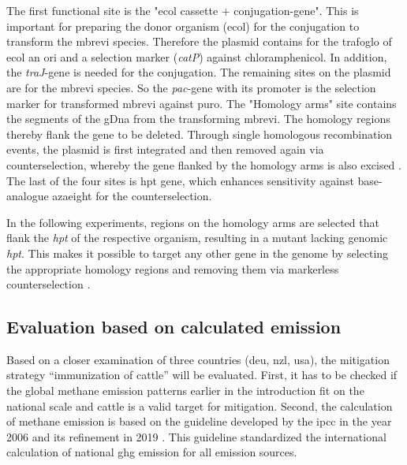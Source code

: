 The first functional site is the "\acrshort{ecol} cassette + conjugation-gene". This is important for preparing the donor organism (\acrshort{ecol}) for the conjugation to transform the \acrlong{mbrevi} species. Therefore the plasmid contains for the \gls{trafoglo} of \acrshort{ecol} an \gls{ori} and a selection marker (\textit{catP}) against chloramphenicol. In addition, the \textit{traJ}-gene is needed for the conjugation.
The remaining sites on the plasmid are for the \acrlong{mbrevi} species. So the \textit{pac}-gene with its promoter is the selection marker for transformed \acrlong{mbrevi} against \acrfull{puro}. The "Homology arms" site contains the segments of the \acrfull{gDna} from the transforming \acrlong{mbrevi}. The homology regions thereby flank the gene to be deleted. Through single homologous recombination events, the plasmid is first integrated and then removed again via \gls{counterselection}, whereby the gene flanked by the homology arms is also excised \parencite{kleinMarkerlessMutagenesisEnables2025}. The last of the four sites is \acrfull{hpt} gene, which enhances sensitivity against base-analogue \acrfull{azaeight} for the \gls{counterselection}.


In the following experiments, regions on the homology arms are selected that flank the \textit{\acrshort{hpt}} of the respective organism, resulting in a mutant lacking genomic \textit{\acrshort{hpt}}. This makes it possible to target any other gene in the genome by selecting the appropriate homology regions and removing them via \gls{markerless} \gls{counterselection} \parencite{kleinMarkerlessMutagenesisEnables2025}.


\subsection{Evaluation based on calculated  emission}
\label{sec:intro_geo}

Based on a closer examination of three countries (\acrshort{deu}, \acrshort{nzl}, \acrshort{usa}), the mitigation strategy “immunization of cattle” will be evaluated. First, it has to be checked if the global methane emission patterns earlier in the introduction fit on the national scale and cattle is a valid target for mitigation.
Second, the calculation of methane emission is based on the guideline developed by the \acrfull{ipcc} in the year 2006 \parencite{IPCC_2006_complete_Guidline} and its refinement in 2019 \parencite{IPCC_2019_Chapter_EnterFE}. This guideline standardized the international calculation of national \acrshort{ghg} emission for all emission sources.

